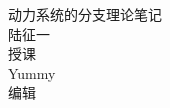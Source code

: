 \documentclass[a4paper,12pt]{ctexbook}%
\begin{document}
\theoremstyle{plain}
\theorembodyfont{\kaishu}
\newtheorem{Thm}{定理}[chapter]
\newtheorem{Cor}[Thm]{推论}
\newtheorem{Prop}[Thm]{性质}
\newtheorem{Def}{定义}[chapter]
\newtheorem{Exa}{例}[chapter]
\newtheorem{Note}{注}[chapter]

\theoremstyle{nonumberplain}
\theoremheaderfont{\bfseries}
\theorembodyfont{\normalfont}
\newtheorem{proof}{证明:}

\theoremstyle{nonumberplain}
\theoremheaderfont{\bfseries}
\theorembodyfont{\normalfont}
\theoremsymbol{$\blacksquare$}
\newtheorem{solve}{解:}

\begin{titlepage}
  \thispagestyle{empty}
  \begin{flushleft}
    {\heiti\Huge 动力系统的分支理论笔记}\\[30mm]
    {\Large 陆征一}\\
    {授课}\\[5mm]
    {\Large Yummy}\\
    {编辑}
  \end{flushleft}
\end{titlepage}
\clearpage{\pagestyle{empty}\cleardoublepage}

\frontmatter

\tableofcontents

\mainmatter











\backmatter
\end{document}
